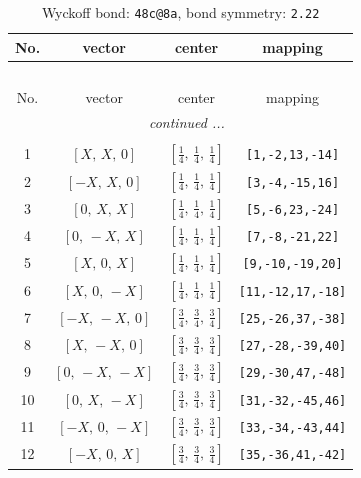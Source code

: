 \documentclass[fleqn,8pt]{jsarticle}
\begin{document}
\begin{longtable}{cccc}
\caption{Wyckoff bond: {\tt 48c@8a}, bond symmetry: {\tt 2.22}}
 \\
 \hline \hline
No. & vector & center & mapping \\ \hline \endfirsthead

\multicolumn{3}{l}{\tablename\ \thetable{}} \\
 \hline \hline
No. & vector & center & mapping \\ \hline \endhead

 \hline \hline
\multicolumn{3}{r}{\footnotesize\it continued ...} \\ \endfoot

 \hline \hline
\multicolumn{3}{r}{} \\ \endlastfoot

1 & $\left[ X,\, X,\, 0 \right]$ & $\left[ \frac{1}{4},\, \frac{1}{4},\, \frac{1}{4} \right]$ & {\tt [1,-2,13,-14]} \\ \hline
2 & $\left[ - X,\, X,\, 0 \right]$ & $\left[ \frac{1}{4},\, \frac{1}{4},\, \frac{1}{4} \right]$ & {\tt [3,-4,-15,16]} \\ \hline
3 & $\left[ 0,\, X,\, X \right]$ & $\left[ \frac{1}{4},\, \frac{1}{4},\, \frac{1}{4} \right]$ & {\tt [5,-6,23,-24]} \\ \hline
4 & $\left[ 0,\, - X,\, X \right]$ & $\left[ \frac{1}{4},\, \frac{1}{4},\, \frac{1}{4} \right]$ & {\tt [7,-8,-21,22]} \\ \hline
5 & $\left[ X,\, 0,\, X \right]$ & $\left[ \frac{1}{4},\, \frac{1}{4},\, \frac{1}{4} \right]$ & {\tt [9,-10,-19,20]} \\ \hline
6 & $\left[ X,\, 0,\, - X \right]$ & $\left[ \frac{1}{4},\, \frac{1}{4},\, \frac{1}{4} \right]$ & {\tt [11,-12,17,-18]} \\ \hline
7 & $\left[ - X,\, - X,\, 0 \right]$ & $\left[ \frac{3}{4},\, \frac{3}{4},\, \frac{3}{4} \right]$ & {\tt [25,-26,37,-38]} \\ \hline
8 & $\left[ X,\, - X,\, 0 \right]$ & $\left[ \frac{3}{4},\, \frac{3}{4},\, \frac{3}{4} \right]$ & {\tt [27,-28,-39,40]} \\ \hline
9 & $\left[ 0,\, - X,\, - X \right]$ & $\left[ \frac{3}{4},\, \frac{3}{4},\, \frac{3}{4} \right]$ & {\tt [29,-30,47,-48]} \\ \hline
10 & $\left[ 0,\, X,\, - X \right]$ & $\left[ \frac{3}{4},\, \frac{3}{4},\, \frac{3}{4} \right]$ & {\tt [31,-32,-45,46]} \\ \hline
11 & $\left[ - X,\, 0,\, - X \right]$ & $\left[ \frac{3}{4},\, \frac{3}{4},\, \frac{3}{4} \right]$ & {\tt [33,-34,-43,44]} \\ \hline
12 & $\left[ - X,\, 0,\, X \right]$ & $\left[ \frac{3}{4},\, \frac{3}{4},\, \frac{3}{4} \right]$ & {\tt [35,-36,41,-42]} \\
\end{longtable}
\end{document}

